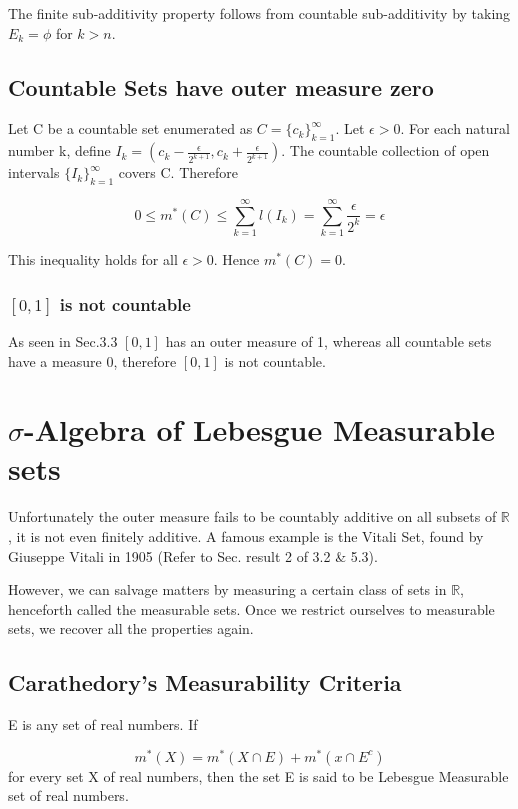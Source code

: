 \documentclass{article}
\begin{document}
The finite sub-additivity property follows from countable sub-additivity by taking $E_k = \phi$ for $k>n$.

\subsection{Countable Sets have outer measure zero}
Let C be a  countable set enumerated as $C=\{c_k\}_{k=1}^\infty$. Let $\epsilon>0.$ For each natural number k, define $I_k=(c_k-{\frac{\epsilon}{2^{k+1}}},c_k+{\frac{\epsilon}{2^{k+1}}}).$ The countable collection of open intervals $\{I_k\}_{k=1}^\infty$ covers C. Therefore

$$ 0 \leq m^*(C) \leq \sum_{k=1}^{\infty}l(I_k) = \sum_{k=1}^{\infty} \frac{\epsilon}{2^k}= \epsilon$$

This inequality holds for all $\epsilon>0$. Hence $m^*(C)=0$.

\subsubsection{$[0,1]$ is not countable}

As seen in Sec.3.3 $[0,1]$ has an outer measure of 1, whereas all countable sets have a measure 0, therefore $[0,1]$ is not countable.
\newpage
\section{$\sigma$-Algebra of Lebesgue Measurable sets}

Unfortunately the outer measure fails to be countably additive on all subsets of $\mathbb{R}$, it is not even finitely additive. A famous example is the Vitali Set, found by Giuseppe Vitali in 1905 (Refer to Sec. result 2 of 3.2 \& 5.3).\smallskip

However, we can salvage matters by measuring a certain class of sets in $\mathbb{R}$, henceforth called the measurable sets. Once we restrict ourselves to measurable sets, we recover all the properties again.

\subsection{Carathedory's Measurability Criteria}

E is any set of real numbers. If

$$m^*(X)= m^*(X \cap E) + m^*(x \cap E^c) $$
for every set X of real numbers, then the set E is said to be Lebesgue Measurable set of real numbers.
\end{document}
